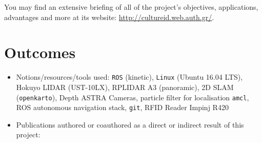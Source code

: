 You may find an extensive briefing of all of the project's objectives,
applications, advantages and more at its website:
\url{http://cultureid.web.auth.gr/}.

\section{Outcomes}

\begin{itemize}
  \item Notions/resources/tools used: \texttt{ROS} (kinetic), \texttt{Linux} (Ubuntu 16.04 LTS), Hokuyo LIDAR (UST-10LX), RPLIDAR A3 (panoramic), 2D SLAM (\texttt{openkarto}), Depth ASTRA Cameras, particle filter for localisation \texttt{amcl}, ROS autonomous navigation stack, \texttt{git}, RFID Reader Impinj R420
\item Publications authored or coauthored as a direct or indirect result of this project: \cite{8739423,8739486,Filotheou2020a,9109328,9244904,Filotheou2020b,9566425,9617436}
\end{itemize}
